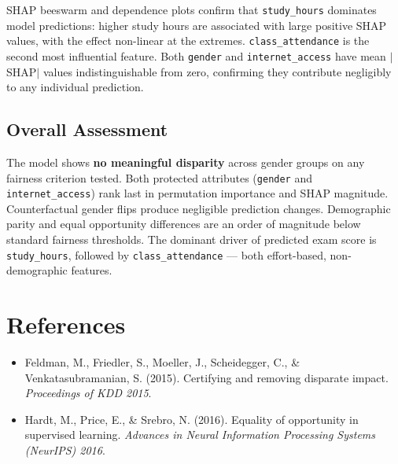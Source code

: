 \documentclass[12pt, letterpaper]{article}
\begin{document}
SHAP beeswarm and dependence plots confirm that \texttt{study\_hours} dominates
model predictions: higher study hours are associated with large positive SHAP values,
with the effect non-linear at the extremes. \texttt{class\_attendance} is the second
most influential feature. Both \texttt{gender} and \texttt{internet\_access} have
mean $|$SHAP$|$ values indistinguishable from zero, confirming they contribute
negligibly to any individual prediction.

\subsection{Overall Assessment}

The model shows \textbf{no meaningful disparity} across gender groups on any
fairness criterion tested. Both protected attributes (\texttt{gender} and
\texttt{internet\_access}) rank last in permutation importance and SHAP magnitude.
Counterfactual gender flips produce negligible prediction changes. Demographic
parity and equal opportunity differences are an order of magnitude below standard
fairness thresholds. The dominant driver of predicted exam score is
\texttt{study\_hours}, followed by \texttt{class\_attendance} --- both
effort-based, non-demographic features.

\section*{References}

\begin{itemize}[noitemsep]
    \item Feldman, M., Friedler, S., Moeller, J., Scheidegger, C., \& Venkatasubramanian, S. (2015). Certifying and removing disparate impact. \textit{Proceedings of KDD 2015}.
    \item Hardt, M., Price, E., \& Srebro, N. (2016). Equality of opportunity in supervised learning. \textit{Advances in Neural Information Processing Systems (NeurIPS) 2016}.
\end{itemize}
\end{document}

